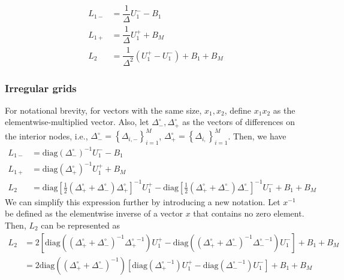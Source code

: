 \documentclass[11pt]{article}
\newcommand{\set}[1]{\ensuremath{\left\{{#1}\right\}}}
\theoremstyle{definition}
\begin{document}
\begin{align}
L_{1-} &= \dfrac{1}{\Delta} U_1^{-} - B_1 \\
L_{1+} &= \dfrac{1}{\Delta} U_1^{+} + B_{M} \\
L_2 &= \dfrac{1}{\Delta^2} (U_1^+ - U_1^-) + B_1 + B_{M}
\end{align}

\subsubsection{Irregular grids}
For notational brevity, for vectors with the same size, $x_1, x_2$, define $x_1 x_2$ as the elementwise-multiplied vector. Also, let $\Delta_-^\circ, \Delta_+^\circ$ as the vectors of differences on the interior nodes, i.e., $\Delta_{-}^\circ = \set{\Delta_{i,-}}_{i=1}^M$, $\Delta_{+}^\circ = \set{\Delta_{i,}}_{i=1}^M$. Then, we have
\begin{align}
L_{1-} &= \text{diag}(\Delta_{-}^{\circ} )^{-1} U_1^{-} - B_1 \\
L_{1+} &= \text{diag}(\Delta_{+}^{\circ} )^{-1} U_1^{+} + B_{M} \\
L_2 &= \text{diag} \left[ \frac{1}{2} ( {\Delta_{+}^{\circ}} + {\Delta_{-}^{\circ}} ) {\Delta_{+}^{\circ}} \right]^{-1}  U_1^{+} - 
 \text{diag} \left[ \frac{1}{2} ( {\Delta_{+}^{\circ}} + {\Delta_{-}^{\circ}} ) {\Delta_{-}^{\circ}} \right]^{-1}  U_1^{-} 
+ B_1 + B_{M} 
\end{align}
We can simplify this expression further by introducing a new notation. Let $x^{-1}$ be defined as the elementwise inverse of a vector $x$ that contains no zero element. Then, $L_2$ can be represented as
\begin{align}
L_2 &=
2\left[ \text{diag} \left( ( {\Delta_{+}^{\circ}} + {\Delta_{-}^{\circ}} )^{-1} {\Delta_{+}^{\circ}}^{-1} \right) U_1^{+} - 
\text{diag} \left( ( {\Delta_{+}^{\circ}} + {\Delta_{-}^{\circ}} )^{-1} {\Delta_{-}^{\circ}}^{-1} \right) U_1^{-}  \right]
+ B_1 + B_{M} \\ \label{eq:L-2-by-basis}
&= 2 \text{diag} \left( ( {\Delta_{+}^{\circ}} + {\Delta_{-}^{\circ}} )^{-1} \right) \left[ \text{diag} \left(  {\Delta_{+}^{\circ}}^{-1} \right) U_1^{+} - 
\text{diag} \left(  {\Delta_{-}^{\circ}}^{-1} \right) U_1^{-}  \right]
+ B_1 + B_{M}
\end{align}
\end{document}
